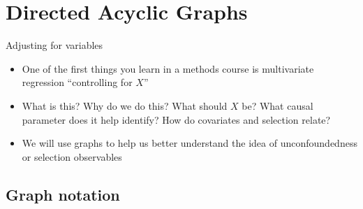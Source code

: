 \documentclass{beamer}
\begin{document}




\section{Directed Acyclic Graphs}

\begin{frame}{Adjusting for variables}

\begin{itemize}
\item One of the first things you learn in a methods course is multivariate regression ``controlling for $X$''
\item What is this? Why do we do this?  What should $X$ be? What causal parameter does it help identify? How do covariates and selection relate?
\item We will use graphs to help us better understand the idea of unconfoundedness or selection observables
\end{itemize}

\end{frame}


\subsection{Graph notation}
\end{document}
